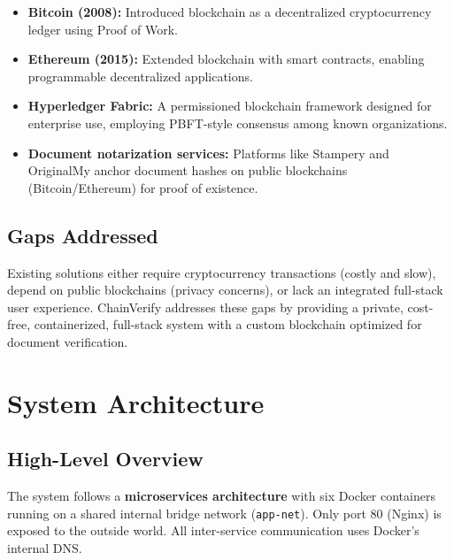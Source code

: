 \documentclass[12pt, a4paper]{report}
\begin{document}
\begin{itemize}
    \item \textbf{Bitcoin (2008):} Introduced blockchain as a decentralized
    cryptocurrency ledger using Proof of Work.
    \item \textbf{Ethereum (2015):} Extended blockchain with smart contracts,
    enabling programmable decentralized applications.
    \item \textbf{Hyperledger Fabric:} A permissioned blockchain framework
    designed for enterprise use, employing PBFT-style consensus among known
    organizations.
    \item \textbf{Document notarization services:} Platforms like Stampery and
    OriginalMy anchor document hashes on public blockchains (Bitcoin/Ethereum)
    for proof of existence.
\end{itemize}

\section{Gaps Addressed}

Existing solutions either require cryptocurrency transactions (costly and
slow), depend on public blockchains (privacy concerns), or lack an integrated
full-stack user experience. ChainVerify addresses these gaps by providing a
private, cost-free, containerized, full-stack system with a custom blockchain
optimized for document verification.


\chapter{System Architecture}

\section{High-Level Overview}

The system follows a \textbf{microservices architecture} with six Docker
containers running on a shared internal bridge network (\texttt{app-net}). Only
port 80 (Nginx) is exposed to the outside world. All inter-service
communication uses Docker's internal DNS.
\end{document}
